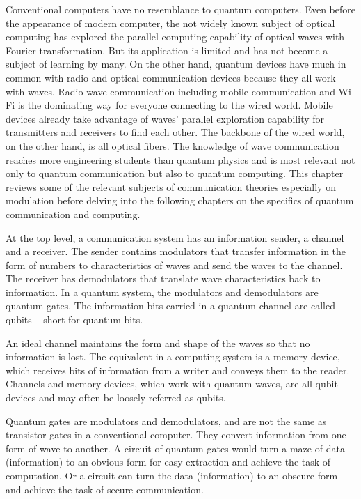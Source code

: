\documentclass[Letter,11pt]{book}
\begin{document}
Conventional computers have no resemblance to quantum computers. Even before the appearance of modern computer, the not widely known subject of optical computing has explored the parallel computing capability of optical waves with Fourier transformation. But its application is limited and has not become a subject of learning by many. On the other hand, quantum devices have much in common with radio and optical communication devices because they all work with waves. Radio-wave communication including mobile communication and Wi-Fi is the dominating way for everyone connecting to the wired world. Mobile devices already take advantage of waves' parallel exploration capability for transmitters and receivers to find each other. The backbone of the wired world, on the other hand, is all optical fibers. The knowledge of wave communication reaches more engineering students than quantum physics and is most relevant not only to quantum communication but also to quantum computing. This chapter reviews some of the relevant subjects of communication theories especially on modulation before delving into the following chapters on the specifics of quantum communication and computing.

At the top level, a communication system has an information sender, a channel and a receiver. The sender contains modulators that transfer information in the form of numbers to characteristics of waves and send the waves to the channel. The receiver has demodulators that translate wave characteristics back to information. In a quantum system, the modulators and demodulators are quantum gates. The information bits carried in a quantum channel are called qubits -- short for quantum bits.

An ideal channel maintains the form and shape of the waves so that no information is lost. The equivalent in a computing system is a memory device, which receives bits of information from a writer and conveys them to the reader. Channels and memory devices, which work with quantum waves, are all qubit devices and may often be loosely referred as qubits.

Quantum gates are modulators and demodulators, and are not the same as transistor gates in a conventional computer. They convert information from one form of wave to another. A circuit of quantum gates would turn a maze of data (information) to an obvious form for easy extraction and achieve the task of computation. Or a circuit can turn the data (information) to an obscure form and achieve the task of secure communication.
\end{document}
